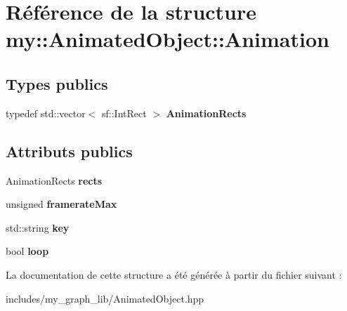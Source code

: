 \hypertarget{structmy_1_1AnimatedObject_1_1Animation}{}\section{Référence de la structure my\+:\+:Animated\+Object\+:\+:Animation}
\label{structmy_1_1AnimatedObject_1_1Animation}
\subsection*{Types publics}
\begin{DoxyCompactItemize}
\item 
\mbox{\label{structmy_1_1AnimatedObject_1_1Animation_af3f7283fa1832cc314b21aecc3ae7367}} 
typedef std\+::vector$<$ sf\+::\+Int\+Rect $>$ {\bfseries Animation\+Rects}
\end{DoxyCompactItemize}
\subsection*{Attributs publics}
\begin{DoxyCompactItemize}
\item 
\mbox{\label{structmy_1_1AnimatedObject_1_1Animation_a303859b9ae4ab314a9b90b90dca55139}} 
Animation\+Rects {\bfseries rects}
\item 
\mbox{\label{structmy_1_1AnimatedObject_1_1Animation_ae486a77dd2ca108c52d1620f2723491d}} 
unsigned {\bfseries framerate\+Max}
\item 
\mbox{\label{structmy_1_1AnimatedObject_1_1Animation_a109781da110faff4ee36450a945153ba}} 
std\+::string {\bfseries key}
\item 
\mbox{\label{structmy_1_1AnimatedObject_1_1Animation_a37d8637ca7e02b062a48b35795f23d85}} 
bool {\bfseries loop}
\end{DoxyCompactItemize}


La documentation de cette structure a été générée à partir du fichier suivant \+:\begin{DoxyCompactItemize}
\item 
includes/my\+\_\+graph\+\_\+lib/Animated\+Object.\+hpp\end{DoxyCompactItemize}
